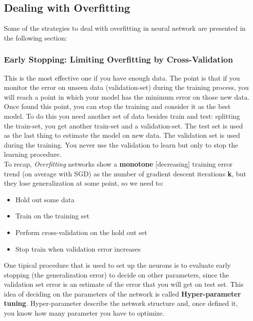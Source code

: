  \subsection{Dealing with Overfitting}
Some of the strategies to deal with overfitting in neural network are presented in the following section:

\subsubsection{Early Stopping: Limiting Overfitting by Cross-Validation}
This is the most effective one if you have enough data. 
The point is that if you monitor the error on unseen data (validation-set) during the training process, you will reach a point in which your model has the minimum error on those new data. Once found this point, you can stop the training and consider it as the best model. To do this you need another set of data besides train and test: splitting the train-set, you get another train-set and a validation-set. The test set is used as the last thing to estimate the model on new data. The validation set is used during the training. You never use the validation to learn but only to stop the learning procedure.\\
To recap, \textit{Overfitting} networks show a \textbf{monotone} [decreasing] training error trend (on average
with SGD) as the number of gradient descent iterations \textbf{k}, but they lose generalization at some point, so we need to:
\begin{itemize}
    \item Hold out some data
    \item Train on the training set
    \item Perform cross-validation on the hold out set
    \item Stop train when validation error increases
\end{itemize}{}

One tipical procedure that is used to set up the neurons is to evaluate early stopping (the generalization error) to decide on other parameters, since the validation set error is an estimate of the error that you will get on test set. This idea of deciding on the parameters of the network is called \textbf{Hyper-parameter tuning}. Hyper-parameter describe the network structure and, once defined it, you know how many parameter you have to optimize. 

